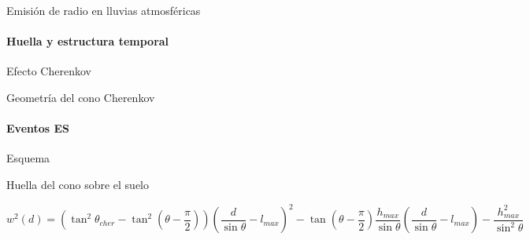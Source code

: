\begin{frame}{Emisi\'on de radio en lluvias atmosf\'ericas}
\framesubtitle{Huella y estructura temporal}
\footnotesize
	\begin{block}{Efecto Cherenkov}
		\begin{overprint}
		\centerline{}
		\centerline{}
		\centerline{}
		\end{overprint}
	\end{block}
\end{frame}

\begin{frame}{Geometr\'ia del cono Cherenkov}
\framesubtitle{Eventos ES}
\footnotesize
	\begin{block}{Esquema}
		\begin{center}
		\end{center}
	\end{block}
	\begin{alertblock}{Huella del cono sobre el suelo}
		\begin{center}
		 \begin{displaymath}
			w^2(d)=
			(\tan^2 \theta_{cher}-\tan^2 (\theta-\frac{\pi}{2}))
			(\frac{d}{\sin \theta}-l_{max})^2
			- \tan (\theta-\frac{\pi}{2}) \frac{h_{max}}{\sin \theta} (\frac{d}{\sin \theta}-l_{max})
			- \frac{h_{max}^2}{\sin^2 \theta}
		 \end{displaymath}
		\end{center}
	\end{alertblock}
\end{frame}